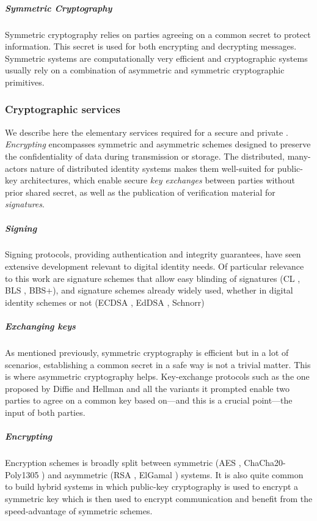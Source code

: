 \subparagraph{Symmetric Cryptography} Symmetric cryptography relies on parties agreeing on a common secret to protect information. This secret is used for both encrypting and decrypting messages. Symmetric systems are computationally very efficient and cryptographic systems usually rely on a combination of asymmetric and symmetric cryptographic primitives.

\subsubsection{Cryptographic services} 
\label{pa:cryptographic-services}
We describe here the elementary services required for a secure and private \eid. \emph{Encrypting} encompasses symmetric and asymmetric schemes designed to preserve the confidentiality of data during transmission or storage. The distributed, many-actors nature of distributed identity systems makes them well-suited for public-key architectures, which enable secure \emph{key exchanges} between parties without prior shared secret, as well as the publication of verification material for \emph{signatures}.

\subparagraph{Signing} 
\label{sp:signing}
Signing protocols, providing authentication and integrity guarantees, have seen extensive development relevant to digital identity needs. Of particular relevance to this work are signature schemes that allow easy blinding of signatures (CL \cite{CL02}, BLS \cite{BLS01}, BBS+\cite{ASM06}), and signature schemes already widely used, whether in digital identity schemes or not (ECDSA \cite{NIST186-5}, EdDSA \cite{BDLSY11}, Schnorr)

\subparagraph{Exchanging keys}
\label{sp:exchanging-keys}
As mentioned previously, symmetric cryptography is efficient but in a lot of scenarios, establishing a common secret in a safe way is not a trivial matter. This is where asymmetric cryptography helps. Key-exchange protocols such as the one proposed by Diffie and Hellman \cite{DH76} and all the variants it prompted enable two parties to agree on a common key based on---and this is a crucial point---the input of both parties.

\subparagraph{Encrypting} 
\label{sp:encrypting}
Encryption schemes is broadly split between symmetric (AES \cite{NIST2001AES}, ChaCha20-Poly1305 \cite{RFC7539}) and asymmetric (RSA \cite{RSA78}, ElGamal \cite{E85}) systems. It is also quite common to build hybrid systems in which public-key cryptography is used to encrypt a symmetric key which is then used to encrypt communication and benefit from the speed-advantage of symmetric schemes.

